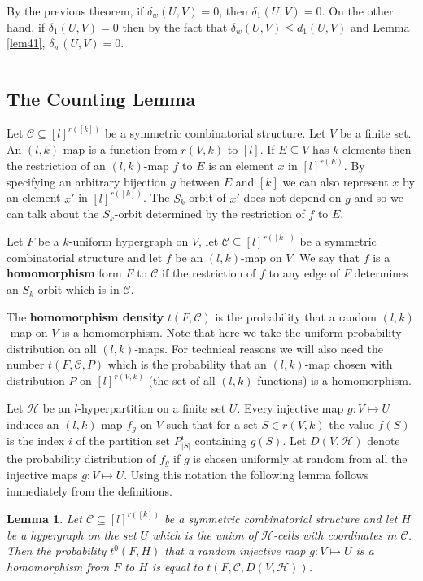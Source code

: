 \documentclass [11pt] {article}
\newcommand{\qed} {\hspace {0.1in} \rule {1.5mm} {3.5mm}}
\newtheorem{lemma}{Lemma}[section]
\begin{document}
\bigskip


\noindent
By the previous theorem, if $\delta_w(U,V)=0$, then
$\delta_1(U,V)=0$. On the other hand, if $\delta_1(U,V)=0$ then
by the fact that $\delta_w(U,V)\leq d_1(U,V)$ and Lemma \ref{lem41},
$\delta_w(U,V)=0$. \qed

\subsection{The Counting Lemma}

 Let $\mathcal{C}\subseteq [l]^{r([k])}$ be a symmetric 
combinatorial structure. Let $V$ be a finite set. 
An $(l,k)$-map is a function from $r(V,k)$ to $[l]$. If $E\subseteq V$ has
$k$-elements then the restriction of an $(l,k)$-map $f$ to $E$ is an 
element $x$ in $[l]^{r(E)}$. By specifying an arbitrary bijection $g$ 
between $E$ and $[k]$ we can also represent $x$ by an element $x'$ in
$[l]^{r([k])}$. The $S_k$-orbit of $x'$ does not depend on $g$ and so we can 
talk about the $S_k$-orbit determined by the restriction of $f$ to $E$.

 Let $F$ be a $k$-uniform hypergraph on $V$, 
let $\mathcal{C}\subseteq[l]^{r([k])}$ be a symmetric combinatorial structure
and let $f$ be an $(l,k)$-map on $V$. We say that $f$ is 
a {\bf homomorphism} form $F$ to $\mathcal{C}$ if the 
restriction of $f$ to any edge of $F$ determines an $S_k$ 
orbit which is in $\mathcal{C}$.

 The {\bf homomorphism density} $t(F,\mathcal{C})$ is the probability that a
 random $(l,k)$-map on $V$ is a homomorphism. Note that here 
we take the uniform probability distribution on all $(l,k)$-maps. 
For technical reasons we will also need the number $t(F,\mathcal{C},P)$ which
is the probability that an $(l,k)$-map chosen with distribution $P$ 
on $[l]^{r(V,k)}$ (the set of all $(l,k)$-functions) is a homomorphism.

Let $\mathcal{H}$ be an $l$-hyperpartition on a finite set $U$. 
Every injective map $g:V\mapsto U$ induces an $(l,k)$-map $f_g$ on $V$ such
that for a set $S\in r(V,k)$ the value $f(S)$ is the index $i$ of the 
partition set $P_{|S|}^i$ containing $g(S)$. Let $D(V,\mathcal{H})$ denote the
probability distribution of $f_g$ if $g$ is chosen uniformly at 
random from all the injective maps $g:V\mapsto U$. Using this 
notation the following lemma follows immediately from the definitions.

\begin{lemma}\label{rmwd} Let $\mathcal{C}\subseteq[l]^{r([k])}$ be a
  symmetric combinatorial structure and let $H$ be a hypergraph on the set $U$ 
which is the union of $\mathcal{H}$-cells with coordinates in
$\mathcal{C}$. Then the probability $t^0(F,H)$ that a random injective map
$g:V\mapsto U$ is a 
homomorphism from $F$ to $H$ is equal to $t(F,\mathcal{C},D(V,\mathcal{H}))$.
\end{lemma}
\end{document}
